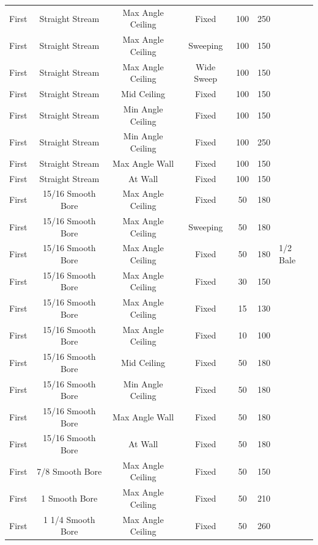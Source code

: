\documentclass[12pt,oneside]{book}
\begin{document}
\begin{table}[!ht]
\begin{tabular}{lcccccl}
First  & Straight Stream  & Max Angle Ceiling      & Fixed              & 100 & 250 &   \\
First  & Straight Stream  & Max Angle Ceiling      & Sweeping           & 100 & 150 &   \\
First  & Straight Stream  & Max Angle Ceiling      & Wide Sweep         & 100 & 150 &   \\
First  & Straight Stream    & Mid Ceiling          & Fixed      		& 100 & 150 &   \\
First  & Straight Stream    & Min Angle Ceiling    & Fixed     		    & 100 & 150 &   \\
First  & Straight Stream    & Min Angle Ceiling    & Fixed      		& 100 & 250 &   \\
First  & Straight Stream    & Max Angle Wall       & Fixed     		    & 100 & 150 &   \\
First  & Straight Stream    & At Wall              & Fixed      		& 100 & 150 &   \\
First  & 15/16 Smooth Bore  & Max Angle Ceiling      & Fixed         	& 50 & 180 &   \\
First  & 15/16 Smooth Bore  & Max Angle Ceiling      & Sweeping      	& 50 & 180 &   \\
First  & 15/16 Smooth Bore  & Max Angle Ceiling      & Fixed        	& 50 & 180 & 1/2 Bale  \\
First  & 15/16 Smooth Bore  & Max Angle Ceiling      & Fixed        	& 30 & 150 &   \\
First  & 15/16 Smooth Bore  & Max Angle Ceiling      & Fixed        	& 15 & 130 &   \\
First  & 15/16 Smooth Bore  & Max Angle Ceiling      & Fixed        	& 10 & 100 &   \\
First  & 15/16 Smooth Bore  & Mid Ceiling            & Fixed 			& 50 & 180 &   \\
First  & 15/16 Smooth Bore  & Min Angle Ceiling      & Fixed			& 50 & 180 &   \\
First  & 15/16 Smooth Bore  & Max Angle Wall         & Fixed			& 50 & 180 &   \\
First  & 15/16 Smooth Bore  & At Wall                & Fixed 			& 50 & 180 &   \\
First  & 7/8 Smooth Bore    & Max Angle Ceiling      & Fixed         	& 50 & 150 &   \\
First  & 1 Smooth Bore      & Max Angle Ceiling      & Fixed        	& 50 & 210 &   \\
First  & 1 1/4 Smooth Bore  & Max Angle Ceiling      & Fixed         	& 50 & 260 &   \\

\end{tabular}
\end{table}
\end{document}

